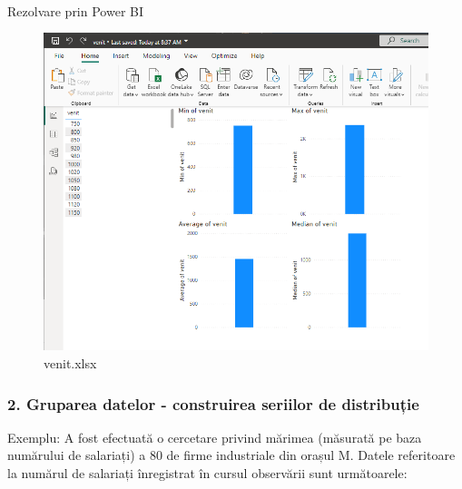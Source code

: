 \documentclass[
  11pt,
  b5paper,
  nottoc]{book}
\makeatletter
\let\oldparagraph\paragraph
\renewcommand{\paragraph}{
    \@ifstar
      \xxxParagraphStar
      \xxxParagraphNoStar
  }
\newcommand{\xxxParagraphStar}[1]{\oldparagraph*{#1}\mbox{}}
\newcommand{\xxxParagraphNoStar}[1]{\oldparagraph{#1}\mbox{}}
\makeatother
\begin{document}
\paragraph{Rezolvare prin Power BI}\label{rezolvare-prin-power-bi}

\begin{figure}[H]

{\centering \includegraphics{date/medie_simpla_Pbi.png}

}

\caption{venit.xlsx}

\end{figure}%

\subsubsection{2. Gruparea datelor - construirea seriilor de
distribuție}\label{gruparea-datelor---construirea-seriilor-de-distribuux21bie}

Exemplu: A fost efectuată o cercetare privind mărimea (măsurată pe baza
numărului de salariați) a 80 de firme industriale din orașul M. Datele
referitoare la numărul de salariați înregistrat în cursul observării
sunt următoarele:
\end{document}
